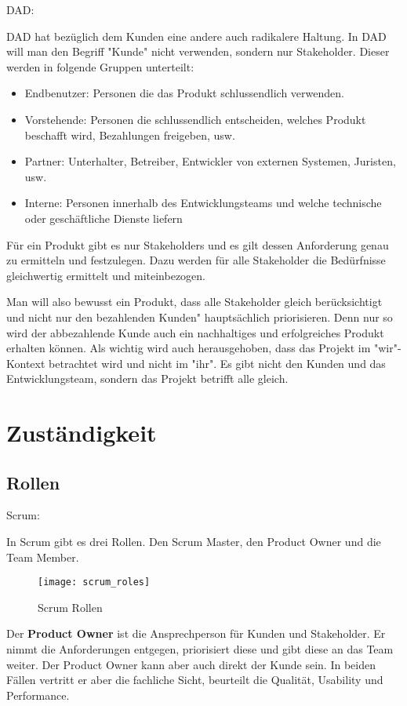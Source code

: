 {\Large DAD:} \cite{planningPrioDad} \medskip

DAD hat bezüglich dem Kunden eine andere auch radikalere Haltung. In DAD will man den Begriff "Kunde" nicht verwenden, sondern nur Stakeholder. Dieser werden in folgende Gruppen unterteilt:
\begin{itemize}
	\item Endbenutzer: Personen die das Produkt schlussendlich verwenden.
	\item Vorstehende: Personen die schlussendlich entscheiden, welches Produkt beschafft wird, Bezahlungen freigeben, usw.
	\item Partner: Unterhalter, Betreiber, Entwickler von externen Systemen, Juristen, usw.
	\item Interne: Personen innerhalb des Entwicklungsteams und welche technische oder geschäftliche Dienste liefern
\end{itemize}
Für ein Produkt gibt es nur Stakeholders und es gilt dessen Anforderung genau zu ermitteln und festzulegen. Dazu werden für alle Stakeholder die Bedürfnisse gleichwertig ermittelt und miteinbezogen. \smallskip

Man will also bewusst ein Produkt, dass alle Stakeholder gleich berücksichtigt und nicht nur den bezahlenden Kunden" hauptsächlich priorisieren. Denn nur so wird der abbezahlende Kunde auch ein nachhaltiges und erfolgreiches Produkt erhalten können.
\medskip
Als wichtig wird auch herausgehoben, dass das Projekt im "wir"-Kontext betrachtet wird und nicht im "ihr". Es gibt nicht den Kunden und das Entwicklungsteam, sondern das Projekt betrifft alle gleich.


\section{Zuständigkeit}
\subsection{Rollen}
{\Large Scrum:} \medskip

In Scrum gibt es drei Rollen. Den Scrum Master, den Product Owner und die Team Member. 
\begin{figure}[H]
	\centering
	\texttt{[image: scrum\_roles]}
	\caption{Scrum Rollen}
	\label{fig:scrumrollen}
\end{figure}

Der \textbf{Product Owner} ist die Ansprechperson für Kunden und Stakeholder. Er nimmt die Anforderungen entgegen, priorisiert diese und gibt diese an das Team weiter. Der Product Owner kann aber auch direkt der Kunde sein. In beiden Fällen vertritt er aber die fachliche Sicht, beurteilt die Qualität, Usability und Performance. \medskip

